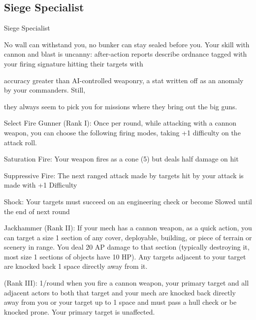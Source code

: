 \subsection{Siege Specialist}

                                             Siege Specialist  

No wall can withstand you, no bunker can stay sealed before you. Your skill with cannon and blast is  
uncanny: after-action reports describe ordnance tagged with your firing signature hitting their targets with  

accuracy greater than AI-controlled weaponry, a stat written off as an anomaly by your commanders. Still,  

they always seem to pick you for missions where they bring out the big guns.   

Select Fire Gunner (Rank I): Once per round, while attacking with a cannon weapon, you can  
choose the following firing modes, taking +1 difficulty on the attack roll.
 
         Saturation Fire: Your weapon fires as a cone (5) but deals half damage on hit
 

                                                                                                                 


         Suppressive Fire: The next ranged attack made by targets hit by your attack is made with  
         +1 Difficulty
 
         Shock: Your targets must succeed on an engineering check or become Slowed until the  
         end of next round
 
Jackhammer (Rank II): If your mech has a cannon weapon, as a quick action, you can target a  
size 1 section of any cover, deployable, building, or piece of terrain or scenery in range. You deal  
20 AP damage to that section (typically destroying it, most size 1 sections of objects have 10  
HP). Any targets adjacent to your target are knocked back 1 space directly away from it.
 
(Rank III): 1/round when you fire a cannon weapon, your primary target and all adjacent actors to  
both that target and your mech are knocked back directly away from you or your target up to 1  
space and must pass a hull check or be knocked prone. Your primary target is unaffected.
 